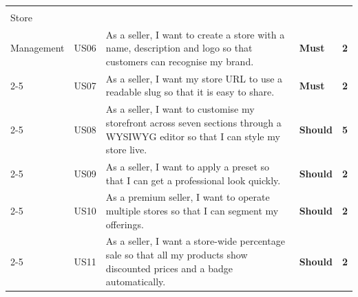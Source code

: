 \begin{longtable}{|>{\centering\arraybackslash\small}p{2.2cm}|>{\centering\arraybackslash\small}p{0.9cm}|>{\small}p{7.4cm}|>{\centering\arraybackslash\small}p{1.3cm}|>{\centering\arraybackslash\small}p{0.6cm}|}
  \cellcolor{featStore}\makecell[c]{\textbf{F2}\\\small Store\\Management}
  & US06 & As a seller, I want to create a store with a name, description and logo so that customers can recognise my brand. & \cellcolor{moscowMust}\textbf{Must} & \cellcolor{complexMed}\textbf{2} \\\cline{2-5}
  \cellcolor{featStore} & US07 & As a seller, I want my store URL to use a readable slug so that it is easy to share. & \cellcolor{moscowMust}\textbf{Must} & \cellcolor{complexMed}\textbf{2} \\\cline{2-5}
  \cellcolor{featStore} & US08 & As a seller, I want to customise my storefront across seven sections through a WYSIWYG editor so that I can style my store live. & \cellcolor{moscowShould}\textbf{Should} & \cellcolor{complexVHigh}\textbf{5} \\\cline{2-5}
  \cellcolor{featStore} & US09 & As a seller, I want to apply a preset so that I can get a professional look quickly. & \cellcolor{moscowShould}\textbf{Should} & \cellcolor{complexMed}\textbf{2} \\\cline{2-5}
  \cellcolor{featStore} & US10 & As a premium seller, I want to operate multiple stores so that I can segment my offerings. & \cellcolor{moscowShould}\textbf{Should} & \cellcolor{complexMed}\textbf{2} \\\cline{2-5}
  \cellcolor{featStore} & US11 & As a seller, I want a store-wide percentage sale so that all my products show discounted prices and a badge automatically. & \cellcolor{moscowShould}\textbf{Should} & \cellcolor{complexMed}\textbf{2} \\\hline


\end{longtable}
